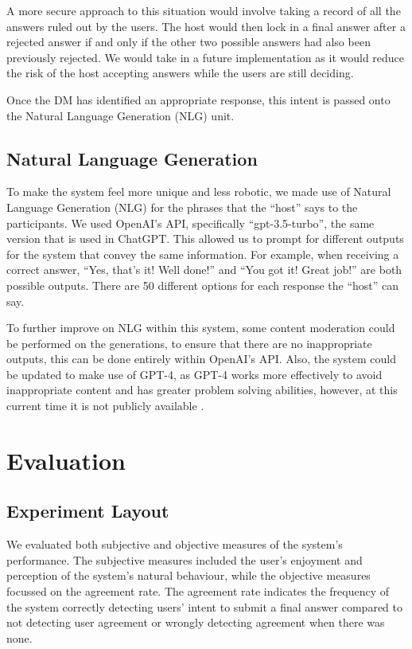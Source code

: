 \documentclass[hidelinks, 11pt]{article}
\begin{document}
A more secure approach to this situation would involve taking a record of all the answers ruled out by the users. The host would then lock in a final answer after a rejected answer if and only if the other two possible answers had also been previously rejected. We would take in a future implementation as it would reduce the risk of the host accepting answers while the users are still deciding.

Once the DM has identified an appropriate response, this intent is passed onto the Natural Language Generation (NLG) unit.

\subsection{Natural Language Generation}
\label{subsec:nlg}

To make the system feel more unique and less robotic, we made use of Natural Language Generation (NLG) for the phrases that the “host” says to the participants. We used OpenAI's API, specifically “gpt-3.5-turbo”, the same version that is used in ChatGPT. This allowed us to prompt for different outputs for the system that convey the same information. For example, when receiving a correct answer, “Yes, that's it! Well done!” and “You got it! Great job!” are both possible outputs. There are 50 different options for each response the “host” can say.

To further improve on NLG within this system, some content moderation could be performed on the generations, to ensure that there are no inappropriate outputs, this can be done entirely within OpenAI's API.  Also, the system could be updated to make use of GPT-4, as GPT-4 works more effectively to avoid inappropriate content and has greater problem solving abilities, however, at this current time it is not publicly available \cite{GPT_4_2023,OpenAI_2023}.


\section{Evaluation}
\label{sec:evaluation}

\subsection{Experiment Layout}
\label{subsec:experiment_layout}
We evaluated both subjective and objective measures of the system's performance. The subjective measures included the user's enjoyment and perception of the system's natural behaviour, while the objective measures focussed on the agreement rate. The agreement rate indicates the frequency of the system correctly detecting users' intent to submit a final answer compared to not detecting user agreement or wrongly detecting agreement when there was none.
\end{document}
